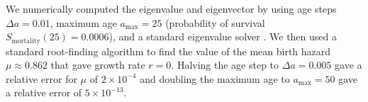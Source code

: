 \documentclass[12pt]{article}
\begin{document}
We numerically computed the eigenvalue and eigenvector by using age
steps $\Delta a = 0.01$, maximum age $a_{\text{max}} = 25$
(probability of survival $S_{\text{mortality}}(25) = 0.0006$), and a
standard eigenvalue solver
\citep[\texttt{scipy.sparse.linalg.eigs},][]{scipy}.  We then used a
standard root-finding algorithm
\citep[\texttt{scipy.optimize.fsolve},][]{scipy} to find the value of
the mean birth hazard $\mu \approx 0.862$ that gave growth rate
$r = 0$.  Halving the age step to $\Delta a = 0.005$ gave a relative
error for $\mu$ of $2 \times 10^{-4}$ and doubling the maximum age to
$a_{\text{max}} = 50$ gave a relative error of $5 \times 10^{-13}$.




\end{document}
